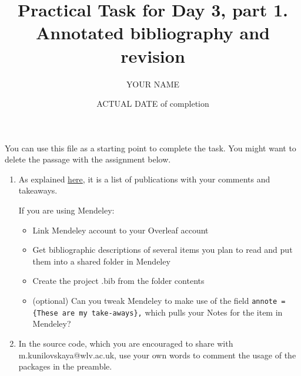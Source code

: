\documentclass[a4paper,11pt]{article}
\title{Practical Task for Day 3, part 1. \\Annotated bibliography and revision}
\author{YOUR NAME}
\date{ACTUAL DATE of completion}
\begin{document}
	
	\maketitle

\bigskip

You can use this file as a starting point to complete the task. You might want to delete the passage with the assignment below.


\begin{enumerate}
	\item As explained \href{https://www.wlv.ac.uk/lib/media/departments/lis/skills/study-guides/LS136-Guide-to-Writing-an-Annotated-Bibliography.pdf}{here}, it is a list of publications with your comments and takeaways.
	
	If you are using Mendeley:
	\begin{itemize}
		\item Link Mendeley account to your Overleaf account
		\item Get bibliographic descriptions of several items you plan to read and put them into a shared folder in Mendeley
		\item Create the project .bib from the folder contents
		\item (optional) Can you tweak Mendeley to make use of the field \verb|annote = {These are my take-aways},| which pulls your Notes for the item in Mendeley?
	\end{itemize}
	\item In the source code, which you are encouraged to share with m.kunilovskaya@wlv.ac.uk, use your own words to comment the usage of the packages in the preamble. 
\end{enumerate}
	
\end{document}
